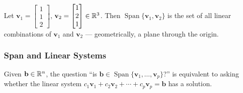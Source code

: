 \begin{example}
  Let $\mathbf{v}_1 =
    \begin{bmatrix}
      1 \\ 1 \\ 2
    \end{bmatrix}
  $,
  $\mathbf{v}_2 =
    \begin{bmatrix}
      1 \\ 2 \\ 1
    \end{bmatrix}
    \in \mathbb{R}^3$.
  Then $\operatorname{Span}\{\mathbf{v}_1, \mathbf{v}_2\}$ is the set of all linear combinations of $\mathbf{v}_1$ and $\mathbf{v}_2$ --- geometrically, a plane through the origin.

  \begin{center}
  \end{center}
\end{example}

\subsubsection{Span and Linear Systems}

Given $\mathbf{b} \in \mathbb{R}^n$, the question ``is $\mathbf{b} \in \operatorname{Span}\{\mathbf{v}_1, \ldots, \mathbf{v}_p\}$?'' is equivalent to asking whether the linear system $c_1 \mathbf{v}_1 + c_2 \mathbf{v}_2 + \cdots + c_p \mathbf{v}_p = \mathbf{b}$ has a solution.

